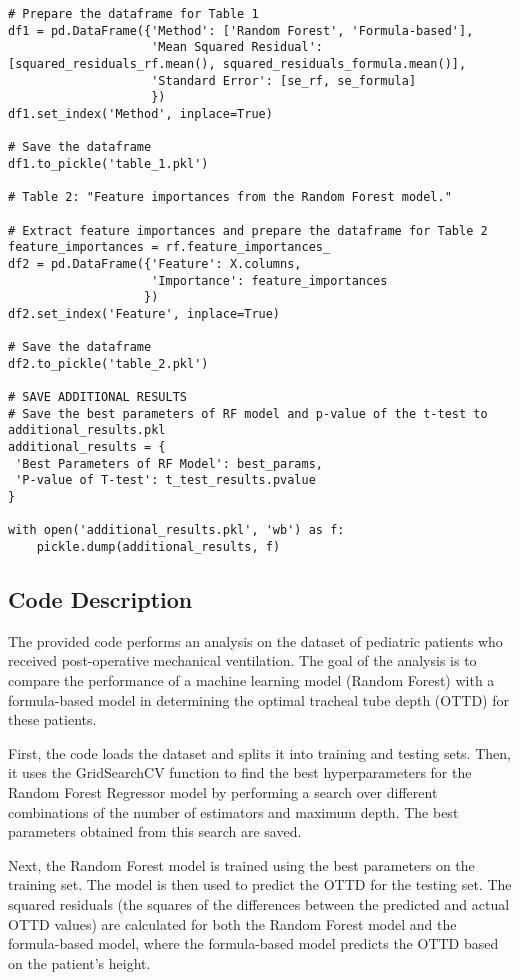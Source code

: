 \documentclass[11pt]{article}
\begin{document}
\begin{verbatim}
# Prepare the dataframe for Table 1
df1 = pd.DataFrame({'Method': ['Random Forest', 'Formula-based'],
                    'Mean Squared Residual': [squared_residuals_rf.mean(), squared_residuals_formula.mean()],
                    'Standard Error': [se_rf, se_formula]
                    })
df1.set_index('Method', inplace=True)

# Save the dataframe
df1.to_pickle('table_1.pkl')

# Table 2: "Feature importances from the Random Forest model."

# Extract feature importances and prepare the dataframe for Table 2
feature_importances = rf.feature_importances_
df2 = pd.DataFrame({'Feature': X.columns,
                    'Importance': feature_importances
                   })
df2.set_index('Feature', inplace=True)

# Save the dataframe
df2.to_pickle('table_2.pkl')

# SAVE ADDITIONAL RESULTS
# Save the best parameters of RF model and p-value of the t-test to additional_results.pkl 
additional_results = {
 'Best Parameters of RF Model': best_params,
 'P-value of T-test': t_test_results.pvalue
}

with open('additional_results.pkl', 'wb') as f:
    pickle.dump(additional_results, f)

\end{verbatim}

\subsection{Code Description}

The provided code performs an analysis on the dataset of pediatric patients who received post-operative mechanical ventilation. The goal of the analysis is to compare the performance of a machine learning model (Random Forest) with a formula-based model in determining the optimal tracheal tube depth (OTTD) for these patients.

First, the code loads the dataset and splits it into training and testing sets. Then, it uses the GridSearchCV function to find the best hyperparameters for the Random Forest Regressor model by performing a search over different combinations of the number of estimators and maximum depth. The best parameters obtained from this search are saved.

Next, the Random Forest model is trained using the best parameters on the training set. The model is then used to predict the OTTD for the testing set. The squared residuals (the squares of the differences between the predicted and actual OTTD values) are calculated for both the Random Forest model and the formula-based model, where the formula-based model predicts the OTTD based on the patient's height.
\end{document}
